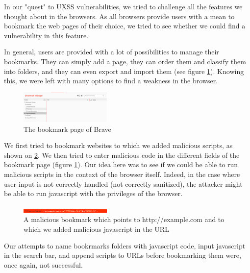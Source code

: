 \documentclass[journal]{IEEEtran}
\begin{document}
In our "quest" to UXSS vulnerabilities, we tried to challenge all the features we thought about in the browsers. As all browsers provide users with a mean to bookmark the web pages of their choice, we tried to see whether we could find a vulnerability in this feature. 

\medskip

In general, users are provided with a lot of possibilities to manage their bookmarks. They can simply add a page, they can order them and classify them into folders, and they can even export and import them (see figure \ref{fig:bookmarkPage}). Knowing this, we were left with many options to find a weakness in the browser. \\

\begin{figure}[h]
\centering
\includegraphics[width=0.4\textwidth]{images/bookmarkPage.png}
\caption{The bookmark page of Brave}
\label{fig:bookmarkPage}
\end{figure}


We first tried to bookmark websites to which we added malicious scripts, as shown on \ref{fig:maliciousBookmark}. We then tried to enter malicious code in the different fields of the bookmark page (figure \ref{fig:bookmarkPage}). Our idea here was to see if we could be able to run malicious scripts in the context of the browser itself. Indeed, in the case where user input is not correctly handled (not correctly sanitized), the attacker might be able to run javascript with the privileges of the browser.

\medskip

\begin{figure}[h]
\centering
\includegraphics[width=0.4\textwidth]{images/maliciousBookmark.png}
\caption{A malicious bookmark which points to http://example.com and to which we added malicious javascript in the URL}
\label{fig:maliciousBookmark}
\end{figure}

Our attempts to name bookrmarks folders with javascript code, input javascript in the search bar, and append scripts to URLs before bookmarking them were, once again, not successful.
\end{document}
